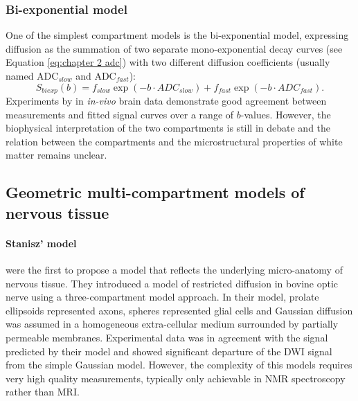 \subsubsection{Bi-exponential model}
One of the simplest compartment models is the bi-exponential model, expressing diffusion as the summation of two separate mono-exponential decay curves (see Equation \ref{eq:chapter 2 adc}) with two different diffusion coefficients (usually named \gls{ADC}$_{slow}$ and \gls{ADC}$_{fast}$):
\begin{equation}
	S_{biexp}(b) = f_{slow} \exp(-b\cdot ADC_{slow}) + f_{fast} \exp(-b\cdot ADC_{fast}).
\end{equation}
Experiments by \citet{Clark:2002} in \emph{in-vivo} brain data demonstrate good agreement between measurements and fitted signal curves over a range of $b$-values. However, the biophysical interpretation of the two compartments is still in debate and the relation between the compartments and the microstructural properties of white matter remains unclear. 
\subsection{Geometric multi-compartment models of nervous tissue}
\paragraph*{Stanisz' model}
\cite{Stanisz:1997} were the first to propose a model that reflects the underlying micro-anatomy of nervous tissue. They introduced a model of restricted diffusion in bovine optic nerve using a three-compartment model approach. In their model, prolate ellipsoids represented axons, spheres represented glial cells and Gaussian diffusion was assumed in a homogeneous extra-cellular medium surrounded by partially permeable membranes. Experimental data was in agreement with the signal predicted by their model and showed significant departure of the {\gls{DWI}} signal from the simple Gaussian model. However, the complexity of this models requires very high quality measurements, typically only achievable in NMR spectroscopy rather than MRI.
